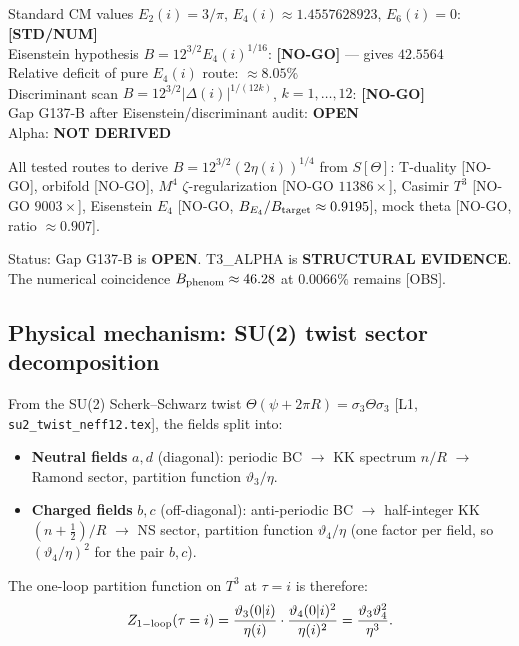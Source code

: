 \documentclass[12pt,a4paper]{article}
\begin{document}
\begin{statusbox}
Standard CM values $E_2(i)=3/\pi$, $E_4(i)\approx1.4557628923$, $E_6(i)=0$: \textbf{[STD/NUM]}\\
Eisenstein hypothesis $B=12^{3/2}E_4(i)^{1/16}$: \textbf{[NO-GO]} --- gives $42.5564$\\
Relative deficit of pure $E_4(i)$ route: $\approx 8.05\%$\\
Discriminant scan $B=12^{3/2}|\Delta(i)|^{1/(12k)}$, $k=1,\dots,12$: \textbf{[NO-GO]}\\
Gap G137-B after Eisenstein/discriminant audit: \textbf{OPEN}\\
Alpha: \textbf{NOT DERIVED}
\end{statusbox}

\begin{tcolorbox}[title={Gap G137-B --- Formal Downgrade Notice}]
All tested routes to derive $B=12^{3/2}(2\eta(i))^{1/4}$ from $S[\Theta]$:
T-duality [NO-GO], orbifold [NO-GO], $M^4$ $\zeta$-regularization
[NO-GO $11386\times$], Casimir $T^3$ [NO-GO $9003\times$],
Eisenstein $E_4$ [NO-GO, $B_{E_4}/B_{\rm target}\approx 0.9195$],
mock theta [NO-GO, ratio $\approx 0.907$].

Status: Gap G137-B is \textbf{OPEN}. T3\_ALPHA is
\textbf{STRUCTURAL EVIDENCE}. The numerical coincidence
$B_{\rm phenom}\approx 46.28$ at $0.0066\%$ remains [OBS].

\subsection{Physical mechanism: SU(2) twist sector decomposition}
\label{sec:physical-mechanism}

From the SU(2) Scherk--Schwarz twist $\Theta(\psi+2\pi R)=\sigma_3\Theta\sigma_3$
[L1, \texttt{su2\_twist\_neff12.tex}], the fields split into:
\begin{itemize}
\item \textbf{Neutral fields} $a,d$ (diagonal): periodic BC
  $\to$ KK spectrum $n/R$ $\to$ Ramond sector, partition function
  $\vartheta_3/\eta$.
\item \textbf{Charged fields} $b,c$ (off-diagonal): anti-periodic BC
  $\to$ half-integer KK $(n+\tfrac12)/R$ $\to$ NS sector, partition
  function $\vartheta_4/\eta$ (one factor per field, so $(\vartheta_4/\eta)^2$
  for the pair $b,c$).
\end{itemize}

The one-loop partition function on $T^3$ at $\tau=i$ is therefore:
\[
Z_{\rm 1-loop}(\tau=i)
= \frac{\vartheta_3(0|i)}{\eta(i)}\cdot
  \frac{\vartheta_4(0|i)^2}{\eta(i)^2}
= \frac{\vartheta_3\vartheta_4^2}{\eta^3}.
\]


\end{tcolorbox}
\end{document}
